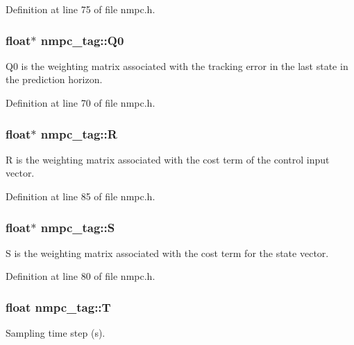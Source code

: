 Definition at line 75 of file nmpc.\-h.

\hypertarget{structnmpc__tag_a1ab0f5c3106cc5091a8a56d274aa7ccd}{
\subsubsection[{Q0}]{\setlength{\rightskip}{0pt plus 5cm}float$\ast$ nmpc\-\_\-tag\-::\-Q0}}\label{structnmpc__tag_a1ab0f5c3106cc5091a8a56d274aa7ccd}
Q0 is the weighting matrix associated with the tracking error in the last state in the prediction horizon. 

Definition at line 70 of file nmpc.\-h.

\hypertarget{structnmpc__tag_affbe53126d0a4a84be7125ff806e7c67}{
\subsubsection[{R}]{\setlength{\rightskip}{0pt plus 5cm}float$\ast$ nmpc\-\_\-tag\-::\-R}}\label{structnmpc__tag_affbe53126d0a4a84be7125ff806e7c67}
R is the weighting matrix associated with the cost term of the control input vector. 

Definition at line 85 of file nmpc.\-h.

\hypertarget{structnmpc__tag_aedce8a78d2150f86bdccc38dcf2a1ff9}{
\subsubsection[{S}]{\setlength{\rightskip}{0pt plus 5cm}float$\ast$ nmpc\-\_\-tag\-::\-S}}\label{structnmpc__tag_aedce8a78d2150f86bdccc38dcf2a1ff9}
S is the weighting matrix associated with the cost term for the state vector. 

Definition at line 80 of file nmpc.\-h.

\hypertarget{structnmpc__tag_abcbd054e1e90f07961a20d933eec6954}{
\subsubsection[{T}]{\setlength{\rightskip}{0pt plus 5cm}float nmpc\-\_\-tag\-::\-T}}\label{structnmpc__tag_abcbd054e1e90f07961a20d933eec6954}


Sampling time step (s). 



